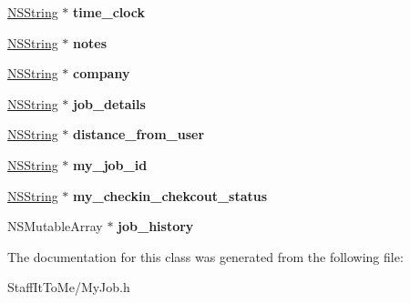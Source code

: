 \begin{DoxyCompactItemize}
\item 
\hypertarget{interface_my_job_ae7fa3b63824d158ecfc7f32871574196}{
\hyperlink{class_n_s_string}{\-N\-S\-String} $\ast$ {\bfseries time\-\_\-clock}}
\label{interface_my_job_ae7fa3b63824d158ecfc7f32871574196}

\item 
\hypertarget{interface_my_job_ad914eabb4bce7bb10a53fcc0203b85ec}{
\hyperlink{class_n_s_string}{\-N\-S\-String} $\ast$ {\bfseries notes}}
\label{interface_my_job_ad914eabb4bce7bb10a53fcc0203b85ec}

\item 
\hypertarget{interface_my_job_a11ad69c12501b9241c8b5a0a28686cea}{
\hyperlink{class_n_s_string}{\-N\-S\-String} $\ast$ {\bfseries company}}
\label{interface_my_job_a11ad69c12501b9241c8b5a0a28686cea}

\item 
\hypertarget{interface_my_job_a6db093bc49a1dccf569e9173e03b927e}{
\hyperlink{class_n_s_string}{\-N\-S\-String} $\ast$ {\bfseries job\-\_\-details}}
\label{interface_my_job_a6db093bc49a1dccf569e9173e03b927e}

\item 
\hypertarget{interface_my_job_ae9b3a4cd9763359739f7ac554518a732}{
\hyperlink{class_n_s_string}{\-N\-S\-String} $\ast$ {\bfseries distance\-\_\-from\-\_\-user}}
\label{interface_my_job_ae9b3a4cd9763359739f7ac554518a732}

\item 
\hypertarget{interface_my_job_adfbed01ebf4c3564cbf289c8caf83224}{
\hyperlink{class_n_s_string}{\-N\-S\-String} $\ast$ {\bfseries my\-\_\-job\-\_\-id}}
\label{interface_my_job_adfbed01ebf4c3564cbf289c8caf83224}

\item 
\hypertarget{interface_my_job_a5f22dd8ff0a7fe922c0a42588147c4ac}{
\hyperlink{class_n_s_string}{\-N\-S\-String} $\ast$ {\bfseries my\-\_\-checkin\-\_\-chekcout\-\_\-status}}
\label{interface_my_job_a5f22dd8ff0a7fe922c0a42588147c4ac}

\item 
\hypertarget{interface_my_job_abdc0c02d80f0e98e900d684f5026f6bf}{
\-N\-S\-Mutable\-Array $\ast$ {\bfseries job\-\_\-history}}
\label{interface_my_job_abdc0c02d80f0e98e900d684f5026f6bf}

\end{DoxyCompactItemize}


\-The documentation for this class was generated from the following file\-:\begin{DoxyCompactItemize}
\item 
\-Staff\-It\-To\-Me/\-My\-Job.\-h\end{DoxyCompactItemize}
